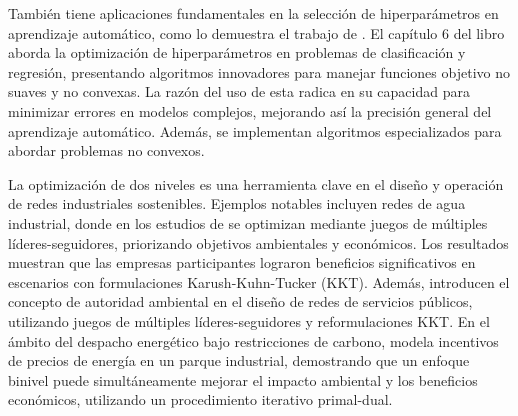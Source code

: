  También tiene aplicaciones fundamentales en la selección de hiperparámetros en aprendizaje automático, como lo demuestra el trabajo de \cite{DempeyZemkoho2020ML}. El capítulo 6 del libro aborda la optimización de hiperparámetros en problemas de clasificación y regresión, presentando algoritmos innovadores para manejar funciones objetivo no suaves y no convexas. La razón del uso de esta radica en su capacidad para minimizar errores en modelos complejos, mejorando así la precisión general del aprendizaje automático. Además, se implementan algoritmos especializados para abordar problemas no convexos.

 La optimización de dos niveles es una herramienta clave en el diseño y operación de redes industriales sostenibles. Ejemplos notables incluyen redes de agua industrial, 
donde en los estudios de \cite{Ramos2016WaterII} se optimizan mediante juegos de múltiples líderes-seguidores, priorizando objetivos ambientales y económicos. Los resultados muestran que las empresas participantes lograron beneficios significativos en escenarios con formulaciones Karush-Kuhn-Tucker (KKT).
Además, \cite{Ramos2018UtilityNO} introducen el concepto de autoridad ambiental en el diseño de redes de servicios públicos, utilizando juegos de múltiples líderes-seguidores y reformulaciones KKT.
En el ámbito del despacho energético bajo restricciones de carbono, \cite{Gu2020BilevelOL} modela incentivos de precios de energía en un parque industrial, demostrando que un enfoque binivel puede simultáneamente mejorar el impacto ambiental y los beneficios económicos, utilizando un procedimiento iterativo primal-dual.

